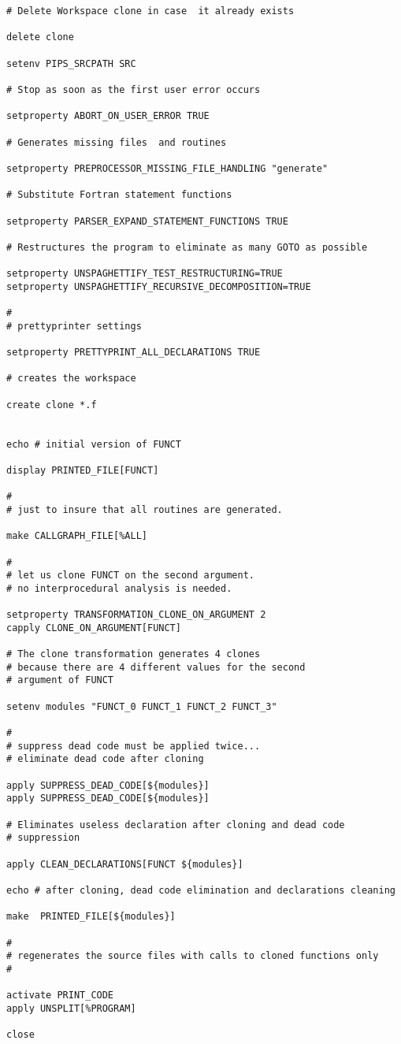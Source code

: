 \documentclass[a4paper]{article}
\begin{document}
\begin{verbatim}
# Delete Workspace clone in case  it already exists

delete clone                      

setenv PIPS_SRCPATH SRC

# Stop as soon as the first user error occurs

setproperty ABORT_ON_USER_ERROR TRUE   

# Generates missing files  and routines 

setproperty PREPROCESSOR_MISSING_FILE_HANDLING "generate" 

# Substitute Fortran statement functions

setproperty PARSER_EXPAND_STATEMENT_FUNCTIONS TRUE

# Restructures the program to eliminate as many GOTO as possible

setproperty UNSPAGHETTIFY_TEST_RESTRUCTURING=TRUE
setproperty UNSPAGHETTIFY_RECURSIVE_DECOMPOSITION=TRUE

#
# prettyprinter settings

setproperty PRETTYPRINT_ALL_DECLARATIONS TRUE

# creates the workspace

create clone *.f


echo # initial version of FUNCT

display PRINTED_FILE[FUNCT]

#
# just to insure that all routines are generated.

make CALLGRAPH_FILE[%ALL]

#
# let us clone FUNCT on the second argument. 
# no interprocedural analysis is needed. 

setproperty TRANSFORMATION_CLONE_ON_ARGUMENT 2
capply CLONE_ON_ARGUMENT[FUNCT]

# The clone transformation generates 4 clones
# because there are 4 different values for the second
# argument of FUNCT

setenv modules "FUNCT_0 FUNCT_1 FUNCT_2 FUNCT_3"

#
# suppress dead code must be applied twice...
# eliminate dead code after cloning

apply SUPPRESS_DEAD_CODE[${modules}]
apply SUPPRESS_DEAD_CODE[${modules}]

# Eliminates useless declaration after cloning and dead code
# suppression

apply CLEAN_DECLARATIONS[FUNCT ${modules}]

echo # after cloning, dead code elimination and declarations cleaning

make  PRINTED_FILE[${modules}]

#
# regenerates the source files with calls to cloned functions only
# 

activate PRINT_CODE
apply UNSPLIT[%PROGRAM]

close 
\end{verbatim}
\end{document}

